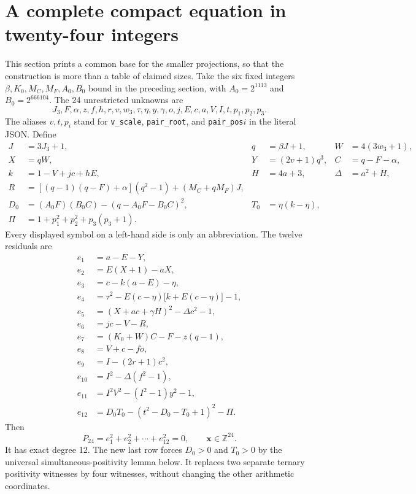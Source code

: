 \documentclass[11pt]{article}
\newcommand{\Z}{\mathbb Z}\newcommand{\N}{\mathbb N}
\begin{document}
\section{A complete compact equation in twenty-four integers}
\label{sec:compact}
This section prints a common base for the smaller projections, so that the
construction is more than a table of claimed sizes.
Take the six fixed integers $\beta,K_0,M_C,M_F,A_0,B_0$ bound in the preceding
section, with $A_0=2^{1113}$ and $B_0=2^{666104}$.
The 24 unrestricted unknowns are
\[
 J_3,F,\alpha,z,f,h,r,v,w_3,\tau,\eta,y,\gamma,o,j,E,c,a,V,I,t,p_1,p_2,p_3.
\]
The aliases $v,t,p_i$ stand for \texttt{v\_scale}, \texttt{pair\_root}, and
\texttt{pair\_pos}$i$ in the literal JSON. Define
\begin{align*}
 J&=3J_3+1,&q&=\beta J+1,&W&=4(3w_3+1),\\
 X&=qW,&Y&=(2v+1)q^3,&C&=q-F-\alpha,\\
 k&=1-V+jc+hE,&H&=4a+3,&\Delta&=a^2+H,\\
 R&=[(q-1)(q-F)+\alpha](q^2-1)+(M_C+qM_F)J,\\
 D_0&=(A_0F)(B_0C)-(q-A_0F-B_0C)^2,&T_0&=\eta(k-\eta),\\
 \Pi&=1+p_1^2+p_2^2+p_3(p_3+1).
\end{align*}
Every displayed symbol on a left-hand side is only an abbreviation.
The twelve residuals are
\begin{align*}
 e_1&=a-E-Y,\\
 e_2&=E(X+1)-aX,\\
 e_3&=c-k(a-E)-\eta,\\
 e_4&=\tau^2-E(c-\eta)\bigl[k+E(c-\eta)\bigr]-1,\\
 e_5&=(X+ac+\gamma H)^2-\Delta c^2-1,\\
 e_6&=jc-V-R,\\
 e_7&=(K_0+W)C-F-z(q-1),\\
 e_8&=V+c-fo,\\
 e_9&=I-(2r+1)c^2,\\
 e_{10}&=I^2-\Delta(f^2-1),\\
 e_{11}&=I^2V^2-(I^2-1)y^2-1,\\
 e_{12}&=D_0T_0-(t^2-D_0-T_0+1)^2-\Pi.
\end{align*}
Then
\[
 \boxed{P_{24}=e_1^2+e_2^2+\cdots+e_{12}^2=0,
 \qquad\boldsymbol{x}\in\Z^{24}.}
\]
It has exact degree 12. The new last row forces $D_0>0$ and $T_0>0$
by the universal simultaneous-positivity lemma below. It replaces two
separate ternary positivity witnesses by four witnesses, without changing
the other arithmetic coordinates.
\end{document}
